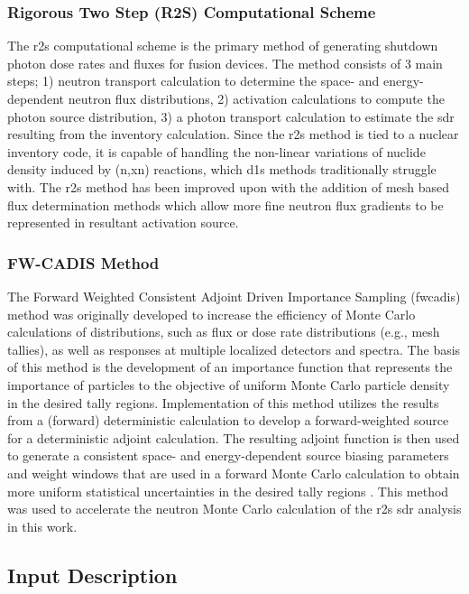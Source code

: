 \documentclass[12pt]{article}
\begin{document}
\subsubsection{Rigorous Two Step (R2S) Computational Scheme}
The \gls{r2s} computational scheme \cite{r2s} is the primary method of generating shutdown
photon dose rates and fluxes for fusion devices. The method consists
of 3 main steps; 1) neutron transport calculation to determine the space- and energy-dependent neutron flux distributions, 2) activation calculations to compute the photon source distribution,
3) a photon transport calculation to estimate the \gls{sdr} resulting from the inventory calculation. Since the \gls{r2s} method is tied to a nuclear inventory code, it is capable of handling
the non-linear variations of nuclide density induced by (n,xn) reactions, which
\gls{d1s} methods traditionally struggle with. The \gls{r2s} method has been improved
upon with the addition of mesh based flux determination methods
\cite{mcr2s,r2smesh,r2suned,pyne_r2s} which allow more fine neutron flux
gradients to be represented in resultant activation source. 

\subsubsection{FW-CADIS Method}
The Forward Weighted Consistent Adjoint Driven Importance Sampling (\gls{fwcadis}) method was originally developed to increase the efficiency of Monte Carlo calculations of distributions, such as flux or dose rate distributions (e.g., mesh tallies), as well as responses at multiple localized detectors and spectra. The basis of this method is the development of an importance function that represents the importance of particles to the objective of uniform Monte Carlo particle density in the desired tally regions. Implementation of this method utilizes the results from a (forward) deterministic calculation to develop a forward-weighted source for a deterministic adjoint calculation. The resulting adjoint function is then used to generate a consistent space- and energy-dependent source biasing parameters and weight windows that are used in a forward Monte Carlo calculation to obtain more uniform statistical uncertainties in the desired tally regions \cite{wagnerNSEFWCADIS} . This method was used to accelerate the neutron Monte Carlo calculation of the \gls{r2s} \gls{sdr}  analysis in this work.


\subsection{Input Description}
\end{document}
